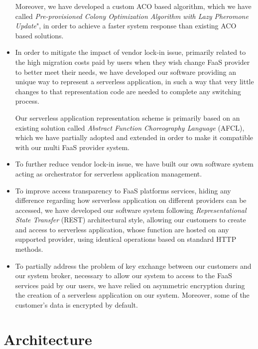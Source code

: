 \documentclass[12pt,a4paper]{report}
\begin{document}
\begin{itemize}
	Moreover, we have developed a custom ACO based algorithm, which we have called \textit{Pre-provisioned Colony Optimization Algorithm with Lazy Pheromone Update}", in order to achieve a faster system response than existing ACO based solutions.
	
	\item In order to mitigate the impact of vendor lock-in issue, primarily related to the high migration costs paid by users when they wish change FaaS provider to better meet their needs, 
	we have developed our software providing an unique way to represent a serverless application, in such a way that very little changes to that representation code are needed to complete any switching process. 
	
	Our serverless application representation scheme is primarily based on an existing solution called \textit{Abstract Function Choreography Language} (AFCL), which we have partially adopted and extended in order to make it compatible with our multi FaaS provider system. 
	
	\item To further reduce vendor lock-in issue, we have built our own software system acting as orchestrator for serverless application management.
	
	\item To improve access transparency to FaaS platforms services, hiding any difference regarding how serverless application on different providers can be accessed, we have developed our software system following \textit{Representational State Transfer} (REST) architectural style, allowing our customers to create and access to serverless application, whose function are hosted on any supported provider, using identical operations based on standard HTTP methods.
	
	\item To partially address the problem of key exchange between our customers and our system broker, necessary to allow our system to access to the FaaS services paid by our users, we have relied on asymmetric encryption during the creation of a serverless application on our system. Moreover, some of the customer's data is encrypted by default.
	
\end{itemize}

\chapter{Architecture}
\end{document}
